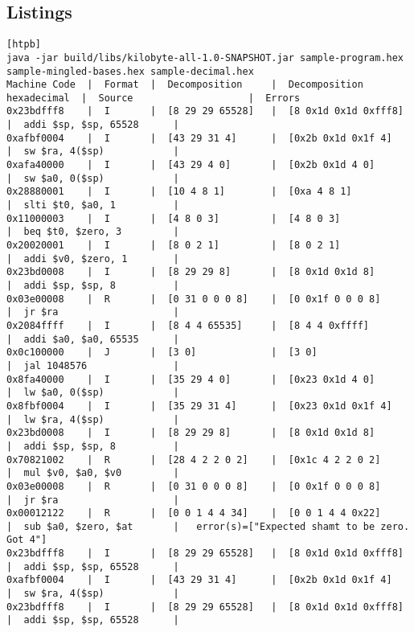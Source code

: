 \begin{landscape}
\section{Listings}

\begin{lstlisting}[style=plain,
    basicstyle=\footnotesize,
    caption=Tabularized output,
    label=listing:tabularized-output,
][htpb]
java -jar build/libs/kilobyte-all-1.0-SNAPSHOT.jar sample-program.hex sample-mingled-bases.hex sample-decimal.hex
Machine Code  |  Format  |  Decomposition     |  Decomposition hexadecimal  |  Source                    |  Errors
0x23bdfff8    |  I       |  [8 29 29 65528]   |  [8 0x1d 0x1d 0xfff8]       |  addi $sp, $sp, 65528      |  
0xafbf0004    |  I       |  [43 29 31 4]      |  [0x2b 0x1d 0x1f 4]         |  sw $ra, 4($sp)            |  
0xafa40000    |  I       |  [43 29 4 0]       |  [0x2b 0x1d 4 0]            |  sw $a0, 0($sp)            |  
0x28880001    |  I       |  [10 4 8 1]        |  [0xa 4 8 1]                |  slti $t0, $a0, 1          |  
0x11000003    |  I       |  [4 8 0 3]         |  [4 8 0 3]                  |  beq $t0, $zero, 3         |  
0x20020001    |  I       |  [8 0 2 1]         |  [8 0 2 1]                  |  addi $v0, $zero, 1        |  
0x23bd0008    |  I       |  [8 29 29 8]       |  [8 0x1d 0x1d 8]            |  addi $sp, $sp, 8          |  
0x03e00008    |  R       |  [0 31 0 0 0 8]    |  [0 0x1f 0 0 0 8]           |  jr $ra                    |  
0x2084ffff    |  I       |  [8 4 4 65535]     |  [8 4 4 0xffff]             |  addi $a0, $a0, 65535      |  
0x0c100000    |  J       |  [3 0]             |  [3 0]                      |  jal 1048576               |  
0x8fa40000    |  I       |  [35 29 4 0]       |  [0x23 0x1d 4 0]            |  lw $a0, 0($sp)            |  
0x8fbf0004    |  I       |  [35 29 31 4]      |  [0x23 0x1d 0x1f 4]         |  lw $ra, 4($sp)            |  
0x23bd0008    |  I       |  [8 29 29 8]       |  [8 0x1d 0x1d 8]            |  addi $sp, $sp, 8          |  
0x70821002    |  R       |  [28 4 2 2 0 2]    |  [0x1c 4 2 2 0 2]           |  mul $v0, $a0, $v0         |  
0x03e00008    |  R       |  [0 31 0 0 0 8]    |  [0 0x1f 0 0 0 8]           |  jr $ra                    |  
0x00012122    |  R       |  [0 0 1 4 4 34]    |  [0 0 1 4 4 0x22]           |  sub $a0, $zero, $at       |   error(s)=["Expected shamt to be zero. Got 4"]
0x23bdfff8    |  I       |  [8 29 29 65528]   |  [8 0x1d 0x1d 0xfff8]       |  addi $sp, $sp, 65528      |  
0xafbf0004    |  I       |  [43 29 31 4]      |  [0x2b 0x1d 0x1f 4]         |  sw $ra, 4($sp)            |  
0x23bdfff8    |  I       |  [8 29 29 65528]   |  [8 0x1d 0x1d 0xfff8]       |  addi $sp, $sp, 65528      | 
\end{lstlisting}


\end{landscape}
